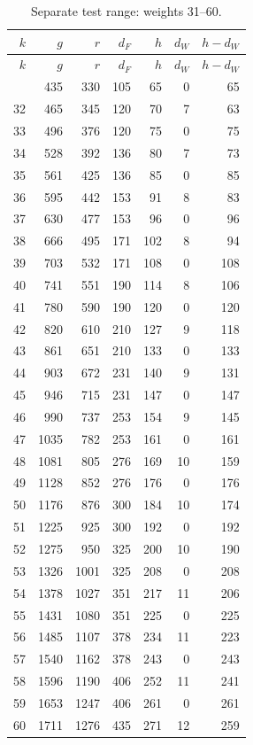 \documentclass[12pt]{amsart}
\theoremstyle{definition}
\theoremstyle{remark}
\numberwithin{equation}{section}
\numberwithin{equation}{section}
\begin{document}
\endgroup
\Needspace{450pt}
\begingroup\small
\begin{longtable}{rrrrrrr}
\caption{Separate test range: weights 31--60.}\\
\toprule $k$ & $g$ & $r$ & $d_F$ & $h$ & $d_W$ & $h-d_W$\\\midrule\endfirsthead
\toprule $k$ & $g$ & $r$ & $d_F$ & $h$ & $d_W$ & $h-d_W$\\\midrule\endhead
\bottomrule\endfoot
31 & 435 & 330 & 105 & 65 & 0 & 65\\
32 & 465 & 345 & 120 & 70 & 7 & 63\\
33 & 496 & 376 & 120 & 75 & 0 & 75\\
34 & 528 & 392 & 136 & 80 & 7 & 73\\
35 & 561 & 425 & 136 & 85 & 0 & 85\\
36 & 595 & 442 & 153 & 91 & 8 & 83\\
37 & 630 & 477 & 153 & 96 & 0 & 96\\
38 & 666 & 495 & 171 & 102 & 8 & 94\\
39 & 703 & 532 & 171 & 108 & 0 & 108\\
40 & 741 & 551 & 190 & 114 & 8 & 106\\
41 & 780 & 590 & 190 & 120 & 0 & 120\\
42 & 820 & 610 & 210 & 127 & 9 & 118\\
43 & 861 & 651 & 210 & 133 & 0 & 133\\
44 & 903 & 672 & 231 & 140 & 9 & 131\\
45 & 946 & 715 & 231 & 147 & 0 & 147\\
46 & 990 & 737 & 253 & 154 & 9 & 145\\
47 & 1035 & 782 & 253 & 161 & 0 & 161\\
48 & 1081 & 805 & 276 & 169 & 10 & 159\\
49 & 1128 & 852 & 276 & 176 & 0 & 176\\
50 & 1176 & 876 & 300 & 184 & 10 & 174\\
51 & 1225 & 925 & 300 & 192 & 0 & 192\\
52 & 1275 & 950 & 325 & 200 & 10 & 190\\
53 & 1326 & 1001 & 325 & 208 & 0 & 208\\
54 & 1378 & 1027 & 351 & 217 & 11 & 206\\
55 & 1431 & 1080 & 351 & 225 & 0 & 225\\
56 & 1485 & 1107 & 378 & 234 & 11 & 223\\
57 & 1540 & 1162 & 378 & 243 & 0 & 243\\
58 & 1596 & 1190 & 406 & 252 & 11 & 241\\
59 & 1653 & 1247 & 406 & 261 & 0 & 261\\
60 & 1711 & 1276 & 435 & 271 & 12 & 259\\
\end{longtable}
\endgroup
\end{document}

